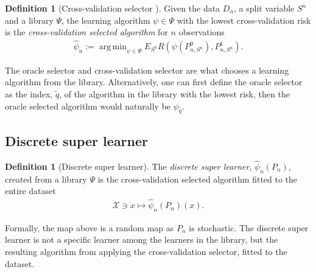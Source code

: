 \documentclass[11pt, a4paper]{article}
\theoremstyle{definition}
\newtheorem{definition}[theorem]{Definition}
\theoremstyle{remark}
\DeclareMathOperator*{\argmin}{arg\,min}
\newcommand{\q}{q}
\newcommand{\btheta}{\theta}
\newcommand{\la}{\psi}
\newcommand{\Sn}{S^n}
\newcommand{\lib}{\Psi}
\begin{document}
\begin{definition}[Cross-validation selector \parencite{laan03}] \label{def:cvselector}
    Given the data $ D_n $, a split variable $ \Sn $ and a library $ \lib $, the learning algorithm $ \la \in \lib $ with the lowest cross-validation risk is the \textit{cross-validation selected algorithm} for $ n $ observations
    \begin{align*}
        \hat{\la}_n := \argmin_{\la \in \lib} E_{\Sn} R(\la(P_{n,\Sn}^0 ) , P_{n, \Sn}^{1}).
    \end{align*}
\end{definition}
%
The oracle selector and cross-validation selector are what chooses a learning algorithm from the library. Alternatively, one can first define the oracle selector as the index, $ \tilde{\q} $, of the algorithm in the library with the lowest risk, then the oracle selected algorithm would naturally be $ \la_{ \tilde{\q} } $. 

\subsection{Discrete super learner}
\begin{definition}[Discrete super learner]
    The \textit{discrete super learner}, $ \hat{\la}_n(P_n) $, created from a library $ \lib $ is the cross-validation selected algorithm fitted to the entire dataset 
    \begin{align*}
        \mathcal{X} \ni x \mapsto \hat{\la}_n(P_n)(x). 
    \end{align*}
\end{definition}
Formally, the map above is a random map as $ P_n $ is stochastic. The discrete super learner is not a specific learner among the learners in the library, but the resulting algorithm from applying the cross-validation selector, fitted to the dataset. 
\end{document}
